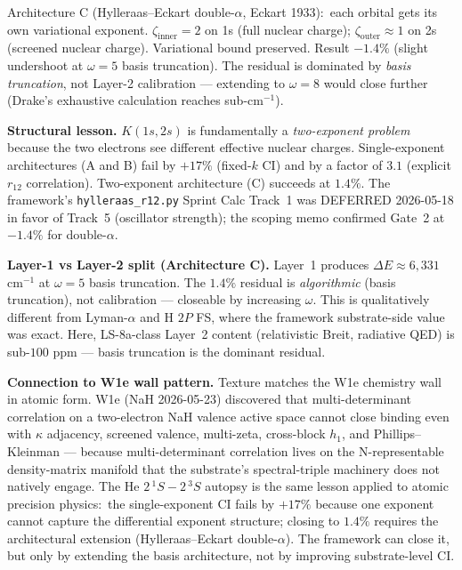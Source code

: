 \documentclass[11pt]{article}
\begin{document}
Architecture C (Hylleraas--Eckart double-$\alpha$, Eckart 1933):\
each orbital gets its own variational exponent.  $\zeta_{\mathrm{inner}}
= 2$ on 1s (full nuclear charge); $\zeta_{\mathrm{outer}} \approx 1$
on 2s (screened nuclear charge).  Variational bound preserved.
Result $-1.4\%$ (slight undershoot at $\omega = 5$ basis
truncation).  The residual is dominated by \emph{basis truncation},
not Layer-2 calibration --- extending to $\omega = 8$ would close
further (Drake's exhaustive calculation reaches sub-cm$^{-1}$).

\textbf{Structural lesson.} $K(1s, 2s)$ is fundamentally a
\emph{two-exponent problem} because the two electrons see different
effective nuclear charges.  Single-exponent architectures (A and B)
fail by $+17\%$ (fixed-$k$ CI) and by a factor of $3.1$ (explicit
$r_{12}$ correlation).
Two-exponent architecture (C) succeeds at $1.4\%$.  The framework's
\texttt{hylleraas\_r12.py} Sprint Calc Track~1 was DEFERRED 2026-05-18
in favor of Track~5 (oscillator strength); the scoping memo
confirmed Gate~2 at $-1.4\%$ for double-$\alpha$.

\textbf{Layer-1 vs Layer-2 split (Architecture C).}  Layer~1
produces $\Delta E \approx 6{,}331$ cm$^{-1}$ at $\omega = 5$
basis truncation.  The $1.4\%$ residual is \emph{algorithmic}
(basis truncation), not calibration --- closeable by increasing
$\omega$.  This is qualitatively different from Lyman-$\alpha$ and
H $2P$ FS, where the framework substrate-side value was exact.  Here, LS-8a-class
Layer~2 content (relativistic Breit, radiative QED) is sub-$100$
ppm --- basis truncation is the dominant residual.

\textbf{Connection to W1e wall pattern.}  Texture matches the W1e
chemistry wall in atomic form.  W1e (NaH 2026-05-23) discovered
that multi-determinant correlation on a two-electron NaH valence
active space cannot close binding even with $\kappa$ adjacency,
screened valence, multi-zeta, cross-block $h_1$, and
Phillips--Kleinman --- because multi-determinant correlation lives
on the N-representable density-matrix manifold that the substrate's
spectral-triple machinery does not natively engage.  The He
$2\,^{1}S - 2\,^{3}S$ autopsy is the same lesson applied to atomic
precision physics:\ the single-exponent CI fails by $+17\%$ because
one exponent cannot capture the differential exponent structure; closing to $1.4\%$ requires the architectural
extension (Hylleraas--Eckart double-$\alpha$).  The framework can
close it, but only by extending the basis architecture, not by
improving substrate-level CI.
\end{document}
